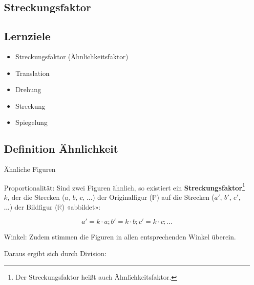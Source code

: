 
\subsection{Streckungsfaktor}

\subsection*{Lernziele}

\begin{itemize}
\item Streckungsfaktor (Ähnlichkeitsfaktor)
\item Translation
\item Drehung
\item Streckung
\item Spiegelung
\end{itemize}

\newpage


\subsection{Definition Ähnlichkeit}



\begin{definition}{Ähnliche Figuren}{}
  
Proportionalität: Sind zwei Figuren ähnlich, so existiert ein
\textbf{Streckungsfaktor}\footnote{Der
  Streckungsfaktor heißt auch Ähnlichkeitsfaktor.}
$k$, der die Strecken ($a$, $b$, $c$, ...) der Originalfigur
($\mathbb{P}$) auf die Strecken ($a'$, $b'$, $c'$, ...) der Bildfigur
($\mathbb{R}$) «abbildet»:

$$a' = k\cdot{}a; b' = k\cdot{}b; c' = k\cdot{} c; ...$$

Winkel: Zudem stimmen die Figuren in allen entsprechenden Winkel überein.
\end{definition}

Daraus ergibt sich durch Division:

